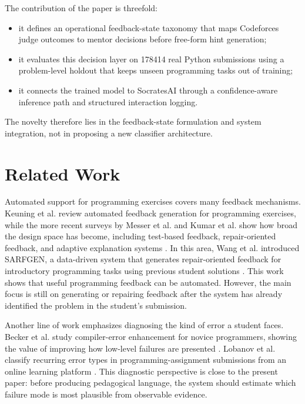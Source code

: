 \documentclass[conference]{IEEEtran}
\begin{document}
The contribution of the paper is threefold:
\begin{itemize}
    \item it defines an operational feedback-state taxonomy that maps Codeforces judge outcomes to mentor decisions before free-form hint generation;
    \item it evaluates this decision layer on 178414 real Python submissions using a problem-level holdout that keeps unseen programming tasks out of training;
    \item it connects the trained model to SocratesAI through a confidence-aware inference path and structured interaction logging.
\end{itemize}
The novelty therefore lies in the feedback-state formulation and system integration, not in proposing a new classifier architecture.


\section{Related Work}

Automated support for programming exercises covers many feedback mechanisms. Keuning et al. review automated feedback generation for programming exercises, while the more recent surveys by Messer et al. and Kumar et al. show how broad the design space has become, including test-based feedback, repair-oriented feedback, and adaptive explanation systems \cite{Keuning2019,Messer2024,Kumar2025}. In this area, Wang et al. introduced SARFGEN, a data-driven system that generates repair-oriented feedback for introductory programming tasks using previous student solutions \cite{Wang2018}. This work shows that useful programming feedback can be automated. However, the main focus is still on generating or repairing feedback after the system has already identified the problem in the student's submission.

Another line of work emphasizes diagnosing the kind of error a student faces. Becker et al. study compiler-error enhancement for novice programmers, showing the value of improving how low-level failures are presented \cite{Becker2016}. Lobanov et al. classify recurring error types in programming-assignment submissions from an online learning platform \cite{Lobanov2019}. This diagnostic perspective is close to the present paper: before producing pedagogical language, the system should estimate which failure mode is most plausible from observable evidence.
\end{document}
